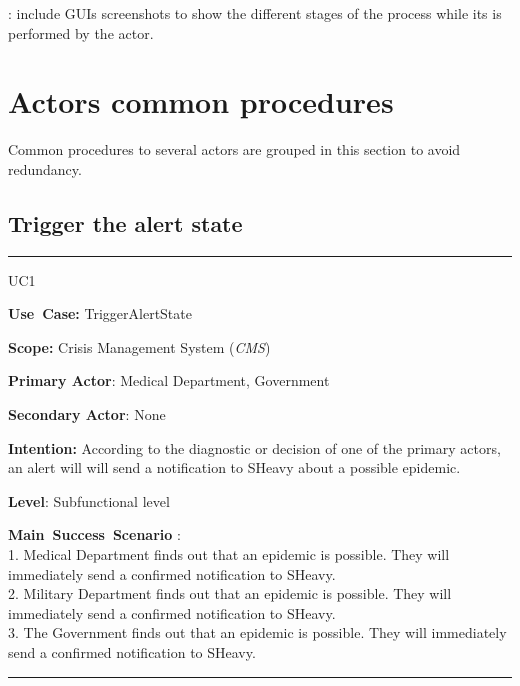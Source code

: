 : include GUIs screenshots to show the
different stages of the process while its is performed by the actor.



\section{Actors common procedures}
Common procedures to several actors are grouped in this section to avoid
redundancy.

\subsection{Trigger the alert state}
\vspace{0.5cm}
\hrule
\vspace{0.5cm}
\begin{lyxlist}{UC1}
\small{
\item [\textbf{Use~Case:}] TriggerAlertState
\item [\textbf{Scope:}] Crisis Management System (\emph{CMS})
\item [\textbf{Primary Actor}:] Medical Department, Government
\item [\textbf{Secondary Actor}:] None
\item [\textbf{Intention:}] According to the diagnostic or decision of one of
the primary actors, an alert will will send a notification to SHeavy about a
possible epidemic.
\item [\textbf{Level}:]Subfunctional level
\item [\textbf{Main~Success~Scenario}]:\\
1. Medical Department finds out that an epidemic is possible. They will
immediately send a confirmed notification to SHeavy.\\
2. Military Department finds out that an epidemic is possible. They will
immediately send a confirmed notification to SHeavy.\\
3. The Government finds out that an epidemic is possible. They will
immediately send a confirmed notification to SHeavy.\\
}
\end{lyxlist}
\hrule 
\vspace{0.5cm} 

